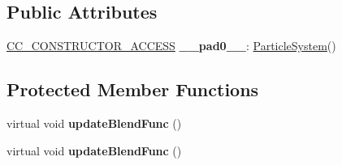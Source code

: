 \subsection*{Public Attributes}
\begin{DoxyCompactItemize}
\item 
\mbox{\label{classParticleSystem_ad2d5088561d086765c540b6b50844883}} 
\hyperlink{_2cocos2d_2cocos_2base_2ccConfig_8h_a25ef1314f97c35a2ed3d029b0ead6da0}{C\+C\+\_\+\+C\+O\+N\+S\+T\+R\+U\+C\+T\+O\+R\+\_\+\+A\+C\+C\+E\+SS} {\bfseries \+\_\+\+\_\+pad0\+\_\+\+\_\+}\+: \hyperlink{classParticleSystem}{Particle\+System}()
\end{DoxyCompactItemize}
\subsection*{Protected Member Functions}
\begin{DoxyCompactItemize}
\item 
\mbox{\label{classParticleSystem_ad08cc40a4751052f14cbc5829dd0c4ee}} 
virtual void {\bfseries update\+Blend\+Func} ()
\item 
\mbox{\label{classParticleSystem_a3c0ef6d2bddf952c2f70b2f5e755becb}} 
virtual void {\bfseries update\+Blend\+Func} ()
\end{DoxyCompactItemize}
